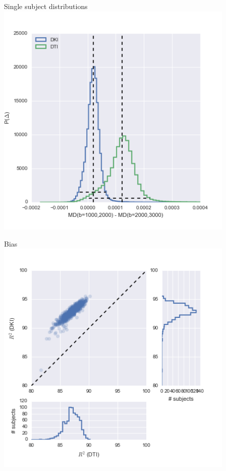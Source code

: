 \documentclass[a0, landscape]{a0poster}
\begin{document}
\begin{multicols}{3}
\begin{minipage}[b]{1\linewidth}
  \begin{minipage}[b]{0.33\linewidth}
  \center Single subject distributions\\
  \includegraphics[width=11.5cm]{reliability_singleton_md.png}
  \end{minipage}
  \begin{minipage}[b]{0.33\linewidth}
    \center Bias\\
    \includegraphics[width=11.5cm]{dti_dki.png}

\end{minipage}
\end{minipage}
\end{multicols}
\end{document}
